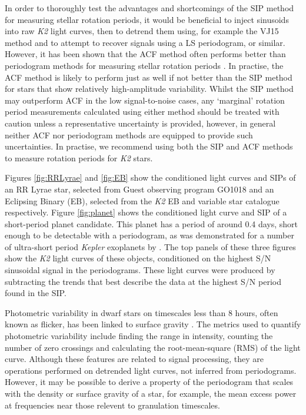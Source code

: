 \documentclass[useAMS, usenatbib, preprint, 12pt]{aastex}
\begin{document}
In order to thoroughly test the advantages and shortcomings of the SIP method
for measuring stellar rotation periods, it would be beneficial to inject
sinusoids into raw {\it K2} light curves, then to detrend them using, for
example the VJ15 method and to attempt to recover signals using a LS
periodogram, or similar.
However, it has been shown that the ACF method often performs better than
periodogram methods for measuring stellar rotation periods
\citep[][]{McQuillan2013, McQuillan2013b, Mazeh2015}.
In practise, the ACF method is likely to perform just as well if not better
than the SIP method for stars that show relatively high-amplitude variability.
Whilst the SIP method may outperform ACF in the low signal-to-noise cases,
any `marginal' rotation period measurements calculated using either method
should be treated with caution unless a representative uncertainty is provided,
however, in general neither ACF nor periodogram methods are equipped to provide
such uncertainties.
In practise, we recommend using both the SIP and ACF methods to measure
rotation periods for {\it K2} stars.

Figures \ref{fig:RRLyrae} and \ref{fig:EB} show the conditioned light curves
and SIPs of an RR Lyrae star, selected from Guest observing program GO1018 and
an Eclipsing Binary (EB), selected from the \citet{Armstrong2015} {\it K2} EB
and variable star catalogue respectively.
Figure \ref{fig:planet} shows the conditioned light curve and SIP of a
short-period planet candidate.
This planet has a period of around 0.4 days, short enough to be detectable
with a periodogram, as was demonstrated for a number of ultra-short
period {\it Kepler} exoplanets by \citet{Sanchis-Ojeda2014}.
The top panels of these three figures show the {\it K2} light curves of these
objects, conditioned on the highest S/N sinusoidal signal in the
periodograms.
These light curves were produced by subtracting the trends that best describe
the data at the highest S/N period found in the SIP.

Photometric variability in dwarf stars on timescales less than 8 hours, often
known as flicker, has been linked to surface gravity
\citep[][]{Bastien2013, Kipping2014}.
The metrics used to quantify photometric variability include finding the range
in intensity, counting the number of zero crossings and calculating the
root-mean-square (RMS) of the light curve.
Although these features are related to signal processing, they are operations
performed on detrended light curves, not inferred from periodograms.
However, it may be possible to derive a property of the periodogram that scales
with the density or surface gravity of a star, for example, the mean excess
power at frequencies near those relevent to granulation timescales.
\end{document}
